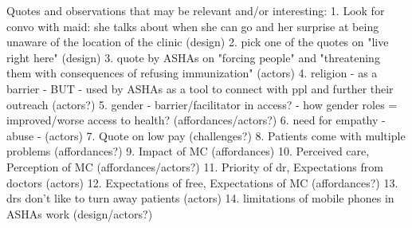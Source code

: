 Quotes and observations that may be relevant and/or interesting:
1. Look for convo with maid: she talks about when she can go and her surprise at being unaware of the location of the clinic (design)
2. pick one of the quotes on "live right here" (design)
3. quote by ASHAs on "forcing people" and "threatening them with consequences of refusing immunization" (actors)
4. religion - as a barrier - BUT - used by ASHAs as a tool to connect with ppl and further their outreach (actors?)
5. gender - barrier/facilitator in access? - how gender roles = improved/worse access to health? (affordances/actors?)
6. need for empathy - abuse - (actors) 
7. Quote on low pay (challenges?)
8. Patients come with multiple problems (affordances?)
9. Impact of MC (affordances)
10. Perceived care, Perception of MC (affordances/actors?)
11. Priority of dr, Expectations from doctors (actors)
12. Expectations of free, Expectations of MC (affordances?)
13. drs don't like to turn away patients (actors)
14. limitations of mobile phones in ASHAs work (design/actors?)
